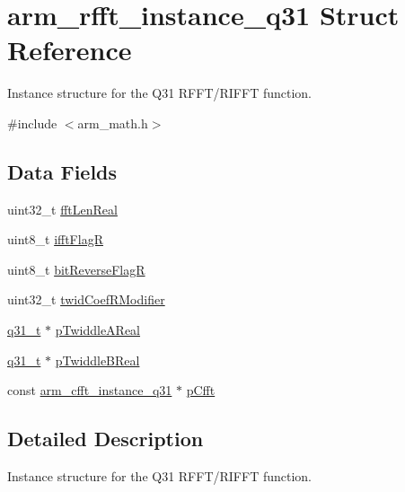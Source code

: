 \hypertarget{structarm__rfft__instance__q31}{}\section{arm\+\_\+rfft\+\_\+instance\+\_\+q31 Struct Reference}
\label{structarm__rfft__instance__q31}


Instance structure for the Q31 R\+F\+F\+T/\+R\+I\+F\+FT function.  




{\ttfamily \#include $<$arm\+\_\+math.\+h$>$}

\subsection*{Data Fields}
\begin{DoxyCompactItemize}
\item 
uint32\+\_\+t \hyperlink{structarm__rfft__instance__q31_adf0d4604cf5546075d9d4cf122d6c986}{fft\+Len\+Real}
\item 
uint8\+\_\+t \hyperlink{structarm__rfft__instance__q31_a787d72055c89e4d62b188d6bd646341c}{ifft\+FlagR}
\item 
uint8\+\_\+t \hyperlink{structarm__rfft__instance__q31_ad56ec2425e2422108b8767b43d944591}{bit\+Reverse\+FlagR}
\item 
uint32\+\_\+t \hyperlink{structarm__rfft__instance__q31_a5b06f7f76c018db993fe6acc5708c589}{twid\+Coef\+R\+Modifier}
\item 
\hyperlink{arm__math_8h_adc89a3547f5324b7b3b95adec3806bc0}{q31\+\_\+t} $\ast$ \hyperlink{structarm__rfft__instance__q31_a059faa282f9186687d843ead4a7a0d7e}{p\+Twiddle\+A\+Real}
\item 
\hyperlink{arm__math_8h_adc89a3547f5324b7b3b95adec3806bc0}{q31\+\_\+t} $\ast$ \hyperlink{structarm__rfft__instance__q31_a611c385424ce77519f599980f96d5846}{p\+Twiddle\+B\+Real}
\item 
const \hyperlink{structarm__cfft__instance__q31}{arm\+\_\+cfft\+\_\+instance\+\_\+q31} $\ast$ \hyperlink{structarm__rfft__instance__q31_aa583d759b8b176ad1696b27eb5821daf}{p\+Cfft}
\end{DoxyCompactItemize}


\subsection{Detailed Description}
Instance structure for the Q31 R\+F\+F\+T/\+R\+I\+F\+FT function. 

